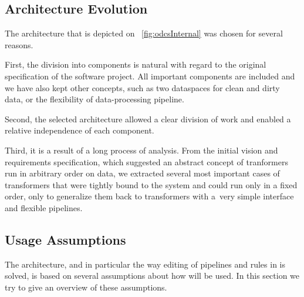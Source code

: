 \subsection{Architecture Evolution}
The architecture that is depicted on \figurename~\ref{fig:odcsInternal} was chosen for several reasons.

First, the division into components is natural with regard to the original specification of the software project. All important components are included and we have also kept other concepts, such as two dataspaces for clean and dirty data, or the flexibility of data-processing pipeline.

Second, the selected architecture allowed a clear division of work and enabled a relative independence of each component.

Third, it is a result of a long process of analysis. From the initial vision and  requirements specification, which suggested an abstract concept of tranformers run in arbitrary order on data, we extracted several most important cases of transformers that were tightly bound to the system and could run only in a fixed order, only to generalize them back to transformers with a~very simple interface and flexible pipelines.

\subsection{Usage Assumptions}
The architecture, and in particular the way editing of pipelines and rules  in \FE is solved, is based on several assumptions about how \odcs will be used. In this section we try to give an overview of these assumptions.


